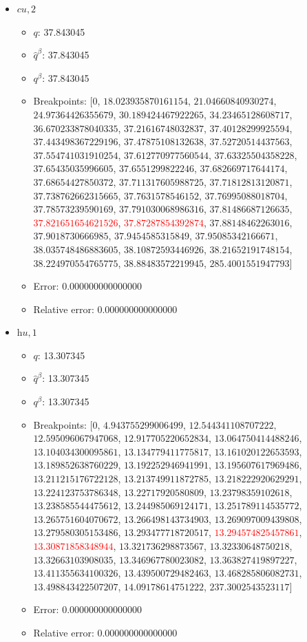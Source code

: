 \documentclass{article}%
\begin{document}
\begin{itemize}
\begin{itemize}
		\item Error: 0.000000000000000%
		\item Relative error: 0.000000000000000%
	\end{itemize}%
	\item $\textit{cu},2$%
	\begin{itemize}%
		\item $q$: 37.843045%
		\item $\hat{q}^\beta$: 37.843045%
		\item $q^\beta$: 37.843045%
		\item Breakpoints: $[$$0$, $18.023935870161154$, $21.04660840930274$, $24.97364426355679$, $30.189424467922265$, $34.23465128608717$, $36.670233878040335$, $37.21616748032837$, $37.40128299925594$, $37.443498367229196$, $37.47875108132638$, $37.52720514437563$, $37.554741031910254$, $37.612770977560544$, $37.63325504358228$, $37.65435035996605$, $37.6551299822246$, $37.682669717644174$, $37.68654427850372$, $37.711317605988725$, $37.71812813120871$, $37.738762662315665$, $37.7631578546152$, $37.76995088018704$, $37.78573239590169$, $37.791030068986316$, $37.81486687126635$, \textcolor{red}{$37.821651654621526$}, \textcolor{red}{$37.87287854392874$}, $37.88148462263016$, $37.9018730666985$, $37.9454585315849$, $37.95085342166671$, $38.035748486883605$, $38.10872593446926$, $38.21652191748154$, $38.224970554765775$, $38.88483572219945$, $285.4001551947793$$]$%
		\item Error: 0.000000000000000%
		\item Relative error: 0.000000000000000%
	\end{itemize}%
	\item $\textit{hu},1$%
	\begin{itemize}%
		\item $q$: 13.307345%
		\item $\hat{q}^\beta$: 13.307345%
		\item $q^\beta$: 13.307345%
		\item Breakpoints: $[$$0$, $4.943755299006499$, $12.544341108707222$, $12.595096067947068$, $12.917705220652834$, $13.064750414488246$, $13.104034300095861$, $13.134779411775817$, $13.161020122653593$, $13.189852638760229$, $13.192252946941991$, $13.195607617969486$, $13.211215176722128$, $13.213749911872785$, $13.218222920629291$, $13.224123753786348$, $13.22717920580809$, $13.23798359102618$, $13.238585544475612$, $13.244985069124171$, $13.251789114535772$, $13.265751604070672$, $13.266498143734903$, $13.269097009439808$, $13.279580305153486$, $13.293477718720517$, \textcolor{red}{$13.294574825457861$}, \textcolor{red}{$13.30871858348944$}, $13.321736298873567$, $13.32330648750218$, $13.32663103908035$, $13.346967780023082$, $13.363827419897227$, $13.411355634100326$, $13.439500729482463$, $13.468285806082731$, $13.498843422507207$, $14.09178614751222$, $237.3002543523117$$]$%
		\item Error: 0.000000000000000%
		\item Relative error: 0.000000000000000%
	\end{itemize}%
\end{itemize}%
\end{document}
